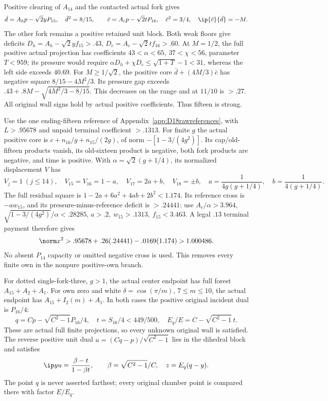 Positive clearing of \(A_{14}\) and the contacted actual fork gives
\[
 \bar d=A_hp-\sqrt2yP_{15},\quad \bar d^2=8/15,\qquad
 \bar c=A_cp-\sqrt2tP_{16},\quad \bar c^2=3/4,\quad
 \ip{\bar c}{\bar d}=-M .
\]
The other fork remains a positive retained unit block.
Both weak floors give deficits
\(D_h=A_h-\sqrt2y f_{15}>.43\),
\(D_c=A_c-\sqrt2t f_{16}>.60\).
At \(M=1/2\), the full positive actual projection has coefficients
\(43<\alpha<65,\ 37<\chi<56\), parameter \(T<959\);
its pressure would require
\(\alpha D_h+\chi D_c\leq\sqrt{1+T}-1<31\),
whereas the left side exceeds \(40.69\).
For \(M\geq1/\sqrt2\), the positive core
\(\bar d+(4M/3)\bar c\) has negative square
\(8/15-4M^2/3\).
Its pressure gap exceeds
\(.43+.8M-\sqrt{4M^2/3-8/15}\).
This decreases on the range and at \(11/10\) is \(>.27\).
All original wall signs hold by actual positive coefficients.
Thus fifteen is strong.

Use the one ending-fifteen reference of
Appendix~\ref{app:D18rawreferences}, with \(L>.95678\) and
unpaid terminal coefficient \(>.1313\).
For finite \(g\) the actual positive core is
\(c+n_{16}/g+n_{15}/(2g)\), of norm
\(-[1-3/(4g^2)]\).
Its cap/old-fifteen products vanish, its old-sixteen product is
negative, both fork products are negative, and time is positive.
With \(\alpha=\sqrt2(g+1/4)\), its normalized displacement \(V\)
has
\[
 V_j=1\ (j\leq14),\quad V_{15}=V_{16}=1-a,\quad
 V_{17}=2a+b,\quad V_{18}=\pm b,\quad
 a=\frac1{4g(g+1/4)},\quad b=\frac1{4(g+1/4)} .
\]
The full residual square is
\(1-2a+6a^2+4ab+2b^2<1.174\).
Its reference cross is \(-aw_{15}\), and its
pressure-minus-reference deficit is \(>.24441\):
use \(A_c/\alpha>3.964\),
\(\sqrt{1-3/(4g^2)}/\alpha<.28285\),
\(a>.2,\ w_{15}>.1313,\ f_{15}<3.463\).
A legal \(.13\) terminal payment therefore gives
\[
 \norm x^2>.95678+.26(.24441)-.0169(1.174)>1.000486.
\]
No absent \(P_{14}\) capacity or omitted negative cross is used.
This removes every finite own in the nonpure positive-own branch.

For dotted single-fork-three, \(g>1\), the actual center endpoint
has full forest \(A_{15}+A_2+A_1\).
For own zero and white \(\delta=\cos(\pi/m)\), \(7\leq m\leq10\),
the actual endpoint has \(A_{15}+I_2(m)+A_1\).
In both cases the positive original incident dual is \(P_{16}/4\):
\[
 q=Cp-\sqrt{C^2-1}P_{16}/4,\quad
 t=S_{16}/4<449/500,\quad E_q/E=C-\sqrt{C^2-1}\,t .
\]
These are actual full finite projections, so every unknown original
wall is satisfied. The reverse positive unit dual
\(u=(Cq-p)/\sqrt{C^2-1}\) lies in the dihedral block and satisfies
\[
 \ip yu=\frac{\beta-t}{1-\beta t},\qquad
 \beta=\sqrt{C^2-1}/C,\quad z=E_q(q-y).
\]
The point \(q\) is never asserted farthest; every original chamber
point is compared there with factor \(E/E_q\).

